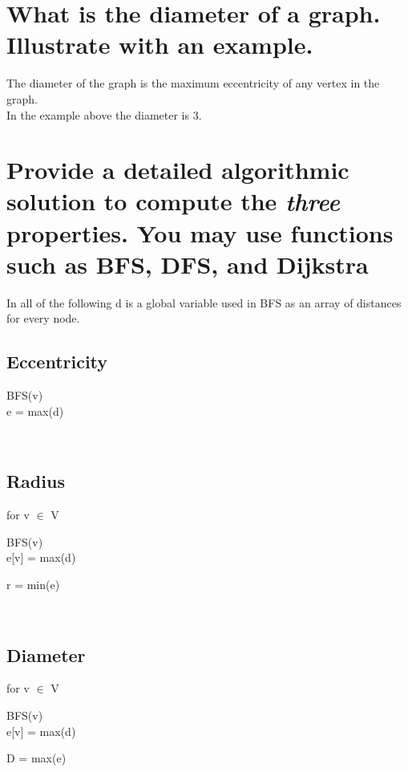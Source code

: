 \documentclass[]{article}
\begin{document}
  \section{What is the diameter of a graph. Illustrate with an example.}

    The diameter of the graph is the maximum eccentricity of any vertex in the graph.\\
    In the example above the diameter is 3.

  \section{Provide a detailed algorithmic solution to compute the \emph{three} properties. You may use functions such as BFS, DFS, and Dijkstra}

  In all of the following d is a global variable used in BFS as an array of distances for every node.

    \begin{minipage}[t]{0.3\linewidth}
      \subsection{Eccentricity}
        \begin{adjustwidth}{2em}{0pt}
            BFS(v) \\
            e = max(d)
        \end{adjustwidth}
    \end{minipage}
\
    \begin{minipage}[t]{0.3\linewidth}
      \subsection{Radius}
        \begin{adjustwidth}{2em}{0pt}
          for v $\in$ V
          \begin{adjustwidth}{1em}{0pt}
            BFS(v) \\
            e[v] = max(d)
          \end{adjustwidth}
          r = min(e)
        \end{adjustwidth}
    \end{minipage}
\
    \begin{minipage}[t]{0.3\linewidth}
      \subsection{Diameter}
        \begin{adjustwidth}{2em}{0pt}
          for v $\in$ V
          \begin{adjustwidth}{1em}{0pt}
            BFS(v) \\
            e[v] = max(d)
          \end{adjustwidth}
          D = max(e)
        \end{adjustwidth}
    \end{minipage}
\end{document}
